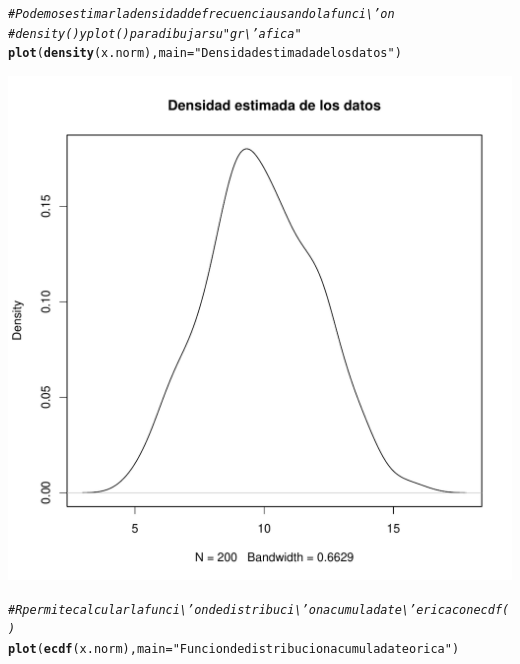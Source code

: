 \documentclass[12pt,letterpaper]{article}\usepackage[]{graphicx}\usepackage[]{color}
\makeatletter
\def\maxwidth{ %
  \ifdim\Gin@nat@width>\linewidth
    \linewidth
  \else
    \Gin@nat@width
  \fi
}
\newcommand{\hlstr}[1]{\textcolor[rgb]{0.192,0.494,0.8}{#1}}%
\newcommand{\hlcom}[1]{\textcolor[rgb]{0.678,0.584,0.686}{\textit{#1}}}%
\newcommand{\hlstd}[1]{\textcolor[rgb]{0.345,0.345,0.345}{#1}}%
\newcommand{\hlkwc}[1]{\textcolor[rgb]{0.333,0.667,0.333}{#1}}%
\newcommand{\hlkwd}[1]{\textcolor[rgb]{0.737,0.353,0.396}{\textbf{#1}}}%
\newenvironment{kframe}{%
 \def\at@end@of@kframe{}%
 \ifinner\ifhmode%
  \def\at@end@of@kframe{\end{minipage}}%
  \begin{minipage}{\columnwidth}%
 \fi\fi%
 \def\FrameCommand##1{\hskip\@totalleftmargin \hskip-\fboxsep
 \colorbox{shadecolor}{##1}\hskip-\fboxsep
     \hskip-\linewidth \hskip-\@totalleftmargin \hskip\columnwidth}%
 \MakeFramed {\advance\hsize-\width
   \@totalleftmargin\z@ \linewidth\hsize
   \@setminipage}}%
 {\par\unskip\endMakeFramed%
 \at@end@of@kframe}
\newenvironment{knitrout}{}{} %
\makeatother
\begin{document}
\begin{knitrout}
\begin{kframe}\begin{alltt}
\hlcom{# Podemos estimar la densidad de frecuencia usando la funci\textbackslash{}'on }
\hlcom{# density() y plot() para dibujar su "gr\textbackslash{}'afica"}
\hlkwd{plot}\hlstd{(}\hlkwd{density}\hlstd{(x.norm),} \hlkwc{main}\hlstd{=}\hlstr{"Densidad estimada de los datos"}\hlstd{)}
\end{alltt}
\end{kframe}
\includegraphics[width=\maxwidth]{figure/unnamed-chunk-16-2} 
\begin{kframe}\begin{alltt}
\hlcom{# R permite calcular la funci\textbackslash{}'on de distribuci\textbackslash{}'on acumulada te\textbackslash{}'erica con ecdf() }
\hlkwd{plot}\hlstd{(}\hlkwd{ecdf}\hlstd{(x.norm),}\hlkwc{main}\hlstd{=}\hlstr{"Funcion de distribucion acumulada teorica"}\hlstd{)}
\end{alltt}
\end{kframe}

\end{knitrout}
\end{document}
